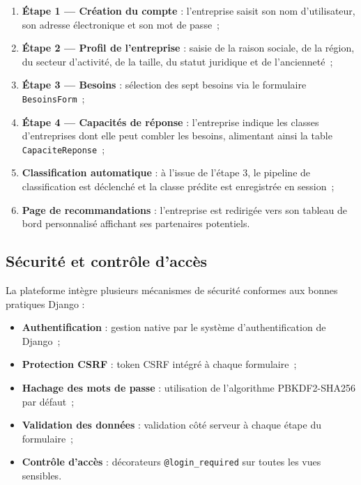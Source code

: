 \documentclass[12pt, a4paper, oneside]{report}
\begin{document}
\begin{enumerate}
  \item \textbf{Étape 1 --- Création du compte} : l'entreprise saisit son nom d'utilisateur, son adresse électronique et son mot de passe~;
  \item \textbf{Étape 2 --- Profil de l'entreprise} : saisie de la raison sociale, de la région, du secteur d'activité, de la taille, du statut juridique et de l'ancienneté~;
  \item \textbf{Étape 3 --- Besoins} : sélection des sept besoins via le formulaire \texttt{BesoinsForm}~;
  \item \textbf{Étape 4 --- Capacités de réponse} : l'entreprise indique les classes d'entreprises dont elle peut combler les besoins, alimentant ainsi la table \texttt{CapaciteReponse}~;
  \item \textbf{Classification automatique} : à l'issue de l'étape 3, le pipeline de classification est déclenché et la classe prédite est enregistrée en session~;
  \item \textbf{Page de recommandations} : l'entreprise est redirigée vers son tableau de bord personnalisé affichant ses partenaires potentiels.
\end{enumerate}

\subsection{Sécurité et contrôle d'accès}

La plateforme intègre plusieurs mécanismes de sécurité conformes aux bonnes pratiques Django \cite{django} :

\begin{itemize}
  \item \textbf{Authentification} : gestion native par le système d'authentification de Django~;
  \item \textbf{Protection CSRF} : token CSRF intégré à chaque formulaire~;
  \item \textbf{Hachage des mots de passe} : utilisation de l'algorithme PBKDF2-SHA256 par défaut~;
  \item \textbf{Validation des données} : validation côté serveur à chaque étape du formulaire~;
  \item \textbf{Contrôle d'accès} : décorateurs \texttt{@login\_required} sur toutes les vues sensibles.
\end{itemize}

\end{document}
